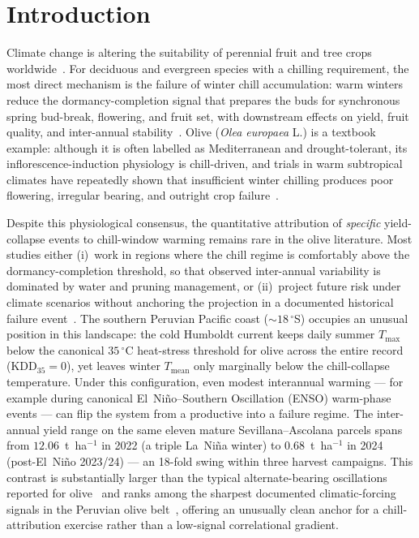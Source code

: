 \documentclass[agronomy,article,submit,pdftex,moreauthors]{Definitions/mdpi}
\begin{document}
\section{Introduction}
\label{sec:introduction}

Climate change is altering the suitability of perennial fruit and tree crops worldwide~\cite{ipcc2023climate,ortizbobea2021,benmoussa2017,parker2019}. For deciduous and evergreen species with a chilling requirement, the most direct mechanism is the failure of winter chill accumulation: warm winters reduce the dormancy-completion signal that prepares the buds for synchronous spring bud-break, flowering, and fruit set, with downstream effects on yield, fruit quality, and inter-annual stability~\cite{luedeling2012,aguilera2014,darbyshire2016,parker2019}. Olive (\textit{Olea europaea} L.) is a textbook example: although it is often labelled as Mediterranean and drought-tolerant, its inflorescence-induction physiology is chill-driven, and trials in warm subtropical climates have repeatedly shown that insufficient winter chilling produces poor flowering, irregular bearing, and outright crop failure~\cite{deMeloAbreu2004,rallo2013,fernandez2023chill}.

Despite this physiological consensus, the quantitative attribution of \emph{specific} yield-collapse events to chill-window warming remains rare in the olive literature. Most studies either (i)~work in regions where the chill regime is comfortably above the dormancy-completion threshold, so that observed inter-annual variability is dominated by water and pruning management, or (ii)~project future risk under climate scenarios without anchoring the projection in a documented historical failure event~\cite{aguilera2014,fraga2020,mairech2021,fernandez2023chill,grillakis2022olive,picornell2023olive}. The southern Peruvian Pacific coast (${\sim}18\,^\circ$S) occupies an unusual position in this landscape: the cold Humboldt current keeps daily summer $T_{\max}$ below the canonical $35\,^\circ$C heat-stress threshold for olive across the entire record (KDD$_{35}=0$), yet leaves winter $T_{\text{mean}}$ only marginally below the chill-collapse temperature. Under this configuration, even modest interannual warming --- for example during canonical El~Ni\~{n}o--Southern Oscillation (ENSO) warm-phase events --- can flip the system from a productive into a failure regime. The inter-annual yield range on the same eleven mature Sevillana--Ascolana parcels spans from $12.06$~t~ha$^{-1}$ in 2022 (a triple La~Ni\~{n}a winter) to $0.68$~t~ha$^{-1}$ in 2024 (post-El~Ni\~{n}o 2023/24) --- an 18-fold swing within three harvest campaigns. This contrast is substantially larger than the typical alternate-bearing oscillations reported for olive~\cite{lavee2007alternate} and ranks among the sharpest documented climatic-forcing signals in the Peruvian olive belt~\cite{pinovargas2022enso,chucuya2022}, offering an unusually clean anchor for a chill-attribution exercise rather than a low-signal correlational gradient.
\end{document}
